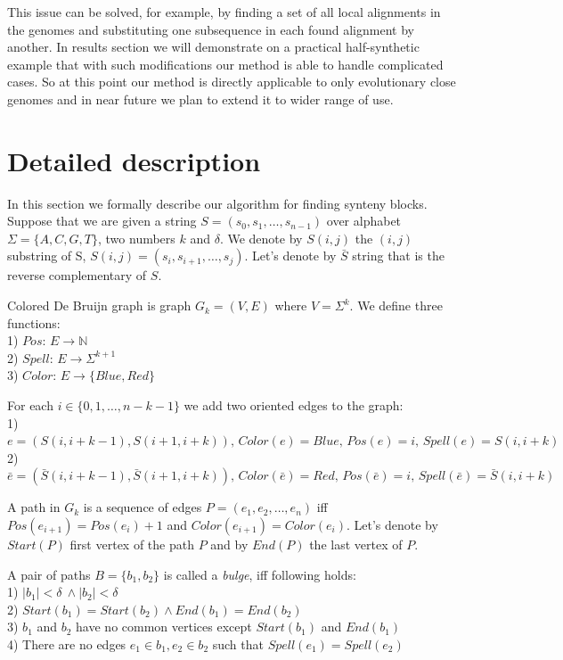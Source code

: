 \documentclass[a4paper,12pt]{scrartcl}
\begin{document}
This issue can be solved, for example, by finding a set of all local alignments in the genomes and substituting one subsequence in each found alignment
by another. In results section we will demonstrate on a practical half-synthetic example that with such modifications our method is able to handle
complicated cases. So at this point our method is directly applicable to only evolutionary close genomes and  in near future we plan to extend it to
wider range of use.

\section{Detailed description}

In this section we formally describe our algorithm for finding synteny blocks. Suppose that we are given a string \(S = (s_{0}, s_{1}, \ldots, s_{n - 1})\)
over alphabet \(\Sigma = \lbrace A, C, G, T \rbrace\), two numbers \(k\) and \(\delta\). We denote by \(S(i, j)\) the \((i, j)\) substring of S,
\(S(i, j) = (s_{i}, s_{i + 1}, \ldots, s_{j}) \).  Let's denote by \(\bar{S}\) string that is the reverse complementary of \(S\). 

Colored De Bruijn graph is graph \(G_{k} = (V, E) \) where \(V = \Sigma ^ k \). We define three functions: \\
1) \(Pos : \, E \rightarrow \mathbb{N} \) \\
2) \(Spell : \, E \rightarrow \Sigma ^ {k + 1} \) \\
3) \(Color : \, E \rightarrow \lbrace Blue, Red \rbrace \) 

For each \(i \in \lbrace{0, 1, \ldots, n - k - 1} \rbrace \) we add two oriented edges to the graph: \\
1) \(e = (S(i, i + k - 1), S(i + 1, i + k)), \, Color(e) = Blue, \, Pos(e) = i, \, Spell(e) = S(i, i + k) \) \\
2) \(\bar{e} = (\bar{S}(i, i + k - 1), \bar{S}(i + 1, i + k)), \, Color(\bar{e}) = Red, \, Pos(\bar{e}) = i, \, Spell(\bar{e}) = \bar{S}(i, i + k) \)

A path in \(G_{k}\) is a sequence of edges \(P = (e_{1}, e_{2}, \ldots, e_{n})\) iff \(Pos(e_{i+1})  = Pos(e_{i}) + 1\) and
\(Color(e_{i + 1}) = Color(e_{i})\). Let's denote by \(Start(P)\) first vertex of the path \(P\) and by \(End(P)\) the last vertex of \(P\).

\newpage

A pair of paths \(B =\lbrace b_{1}, b_{2} \rbrace \)
is called a \textit{bulge}, iff following holds: \\
1) \(|b_{1}| < \delta\ \wedge |b_{2}| < \delta\) \\
2) \(Start(b_{1}) = Start(b_{2}) \wedge End(b_{1}) = End(b_{2}) \) \\
3) \(b_{1}\) and \(b_{2}\) have no common vertices except \(Start(b_{1})\) and \(End(b_{1})\) \\
4) There are no edges \(e_{1} \in b_{1}, e_{2} \in b_{2} \) such that \(Spell(e_{1}) = Spell(e_{2})\)
\end{document}
